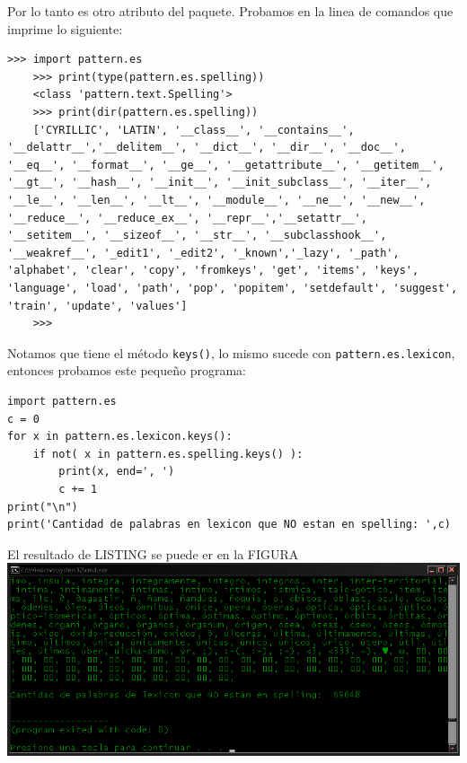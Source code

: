 Por lo tanto es otro atributo del paquete. Probamos en la linea de comandos que imprime lo siguiente:
\begin{Verbatim}[breaklines=true, breakanywhere=true]
    >>> import pattern.es
    >>> print(type(pattern.es.spelling))
    <class 'pattern.text.Spelling'>
    >>> print(dir(pattern.es.spelling))
    ['CYRILLIC', 'LATIN', '__class__', '__contains__', '__delattr__','__delitem__', '__dict__', '__dir__', '__doc__', '__eq__', '__format__', '__ge__', '__getattribute__', '__getitem__', '__gt__', '__hash__', '__init__', '__init_subclass__', '__iter__', '__le__', '__len__', '__lt__', '__module__', '__ne__', '__new__', '__reduce__', '__reduce_ex__', '__repr__','__setattr__', '__setitem__', '__sizeof__', '__str__', '__subclasshook__', '__weakref__', '_edit1', '_edit2', '_known','_lazy', '_path', 'alphabet', 'clear', 'copy', 'fromkeys', 'get', 'items', 'keys', 'language', 'load', 'path', 'pop', 'popitem', 'setdefault', 'suggest', 'train', 'update', 'values']
    >>>
\end{Verbatim}

Notamos que tiene el método \texttt{keys()}, lo mismo sucede con \texttt{pattern.es.lexicon}, entonces probamos este pequeño programa:
\begin{listing}
\begin{verbatim}
import pattern.es
c = 0
for x in pattern.es.lexicon.keys():
	if not( x in pattern.es.spelling.keys() ):
		print(x, end=', ')
		c += 1
print("\n")
print('Cantidad de palabras en lexicon que NO estan en spelling: ',c)
\end{verbatim}
\end{listing}
El resultado de LISTING se puede er en la FIGURA
\includegraphics[width=\textwidth,keepaspectratio]{img/lexnspe.png}

